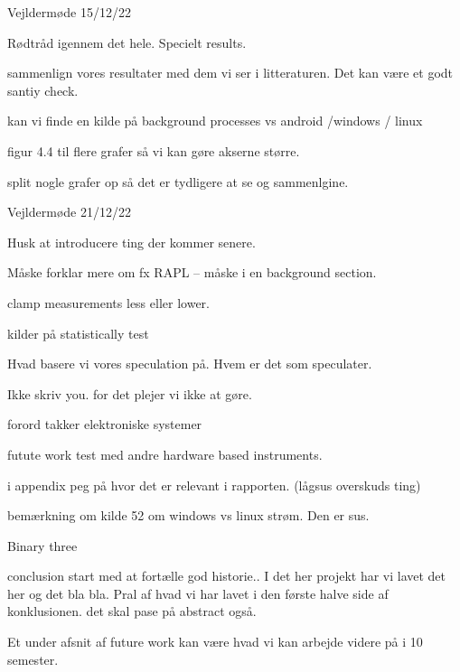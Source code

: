 Vejldermøde 15/12/22

Rødtråd igennem det hele. Specielt results. 


sammenlign vores resultater med dem vi ser i litteraturen. Det kan være et godt santiy check. 


kan vi finde en kilde på background processes vs android /windows / linux

figur 4.4 til flere grafer så vi kan gøre akserne større.

split nogle grafer op så det er tydligere at se og sammenlgine.




Vejldermøde 21/12/22

Husk at introducere ting der kommer senere.

Måske forklar mere om fx RAPL -- måske i en background section.

clamp measurements less eller lower.

kilder på statistically test 

Hvad basere vi vores speculation på. Hvem er det som speculater.

Ikke skriv you. for det plejer vi ikke at gøre.

forord takker elektroniske systemer

futute work test med andre hardware based instruments.

i appendix peg på hvor det er relevant i rapporten. (lågsus overskuds ting)

bemærkning om kilde 52 om windows vs linux strøm. Den er sus.

Binary three    

conclusion start med at fortælle god historie.. I det her projekt har vi lavet det her og det bla bla. Pral af hvad vi har lavet i den første halve side af konklusionen. 
det skal pase på abstract også.

Et under afsnit af future work kan være hvad vi kan arbejde videre på i 10 semester.